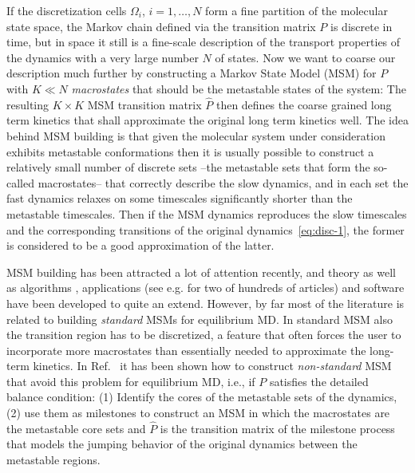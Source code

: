 \documentclass[journal=jctcce,manuscript=article]{achemso}
\newcommand{\vect}[1]{#1}
\begin{document}
If the discretization cells $\Omega_i$, $i=1,\ldots,N$ form a fine
partition of the molecular state space, the Markov chain defined via
the transition matrix $P$
 is discrete in time, but in space it still is a fine-scale description of the transport properties of the
dynamics with a very large number $N$ of states.  Now we want to coarse our description much further by
constructing a Markov State Model (MSM) for $\vect P$ with $K\ll N$
\emph{macrostates} that should be the metastable states of the system: The resulting $K\times K$ MSM transition matrix $\hat{\vect P}$
then defines the coarse grained long term kinetics that shall
approximate the original long term kinetics well. 
The idea behind MSM building is that given the molecular system under consideration exhibits metastable conformations then it is usually possible to construct a
relatively small number of discrete sets --the metastable sets that form the so-called macrostates-- that
correctly describe the slow  dynamics, and 
in each set the fast dynamics relaxes on some timescales significantly shorter than the metastable timescales.
Then if the MSM dynamics reproduces the slow timescales and the corresponding transitions
of the original dynamics~\eqref{eq:disc-1},
the former is considered to be a good approximation of the latter.

MSM building has been attracted a lot of attention recently, and theory  \cite{A19-31} as well as algorithms \cite{A19-1}, applications (see e.g. \cite{A19-26,PNAS09} for two of hundreds of articles) and software \cite{A19-49, MSMBuilder} have been developed to quite an extend. However, 
by far most of the literature is related to building \emph{standard} MSMs for equilibrium MD. In standard MSM also the transition region has to be discretized, a feature that often forces the user to incorporate more macrostates than essentially needed to approximate the long-term kinetics.
In Ref.~\cite{sarich2010approximation, A19-31,schuette2011markov,BucheteHummer} it has been shown how to construct \emph{non-standard} MSM that avoid this problem for equilibrium MD, i.e., if $\vect P$ satisfies the detailed balance
condition: (1) Identify the cores of the metastable sets of the
dynamics, (2) use them as milestones to construct an MSM in which the
macrostates are the metastable core sets and $\hat{\vect P}$ is the transition
matrix of the milestone process \cite{A19-31,schuette2011markov,A19-29} that models the jumping behavior of
the original dynamics between the metastable regions. 
\end{document}

